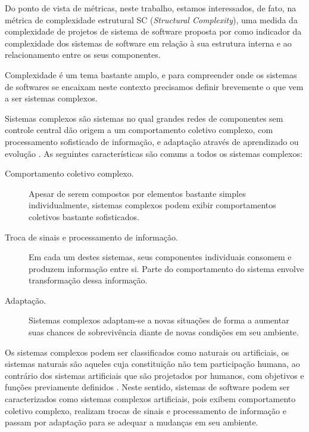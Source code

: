 Do ponto de vista de métricas, neste trabalho, estamos interessados, de fato, na métrica
de complexidade estrutural SC ({\it Structural Complexity}), uma medida da
complexidade de projetos de sistema de software proposta por
 como indicador da complexidade dos sistemas de software
em relação à sua estrutura interna e ao relacionamento entre os seus
componentes.

Complexidade é um tema bastante amplo, e para compreender onde os
sistemas de softwares se encaixam neste contexto precisamos definir brevemente
o que vem a ser sistemas complexos.

Sistemas complexos são sistemas no qual grandes redes de componentes sem
controle central dão origem a um comportamento
coletivo complexo, com processamento sofisticado de informação, e adaptação
através de aprendizado ou evolução \cite{Mitchell2009}. As seguintes
características são comuns a todos os sistemas complexos:

\begin{description}

  \item[Comportamento coletivo complexo.] Apesar de serem compostos por
  elementos bastante simples individualmente, sistemas complexos podem exibir
  comportamentos coletivos bastante sofisticados.

  \item[Troca de sinais e processamento de informação.] Em cada um destes
  sistemas, seus componentes individuais consomem e produzem informação entre
  si. Parte do comportamento do sistema envolve transformação dessa informação.

  \item[Adaptação.] Sistemas complexos adaptam-se a novas situações de forma a
  aumentar suas chances de sobrevivência diante de novas condições em seu
  ambiente.

\end{description}

Os sistemas complexos podem ser classificados como naturais ou artificiais, os
sistemas naturais são aqueles cuja constituição não tem participação humana, ao
contrário dos sistemas artificiais que são projetados por humanos, com
objetivos e funções previamente definidos \cite{Simon1996}. Neste sentido,
sistemas de software podem ser caracterizados como sistemas complexos
artificiais, pois exibem comportamento coletivo complexo, realizam trocas de
sinais e processamento de informação e passam por adaptação para se adequar a
mudanças em seu ambiente.

